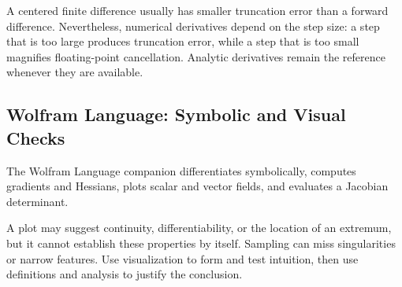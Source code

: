 \begin{bookinsight}
A centered finite difference usually has smaller truncation error than a forward difference. Nevertheless, numerical derivatives depend on the step size: a step that is too large produces truncation error, while a step that is too small magnifies floating-point cancellation. Analytic derivatives remain the reference whenever they are available.
\end{bookinsight}

\subsection{Wolfram Language: Symbolic and Visual Checks}

The Wolfram Language companion differentiates symbolically, computes gradients and Hessians, plots scalar and vector fields, and evaluates a Jacobian determinant.



\begin{mistakebox}
A plot may suggest continuity, differentiability, or the location of an extremum, but it cannot establish these properties by itself. Sampling can miss singularities or narrow features. Use visualization to form and test intuition, then use definitions and analysis to justify the conclusion.
\end{mistakebox}
